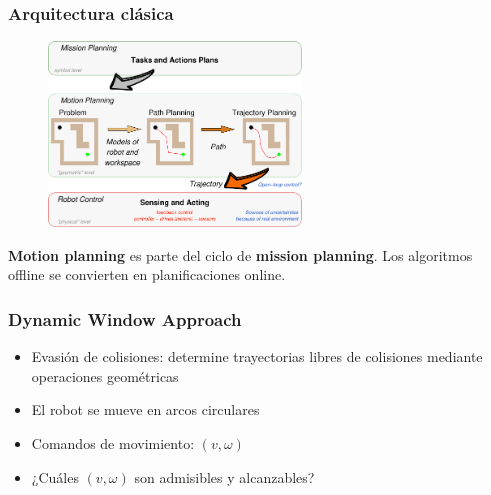 \begin{frame}
    \frametitle{Arquitectura clásica}
    
    \begin{figure}[!h]
        \includegraphics[width=0.6\textwidth]{images/motion_planning_architecture.pdf}
    \end{figure}

    {\bf Motion planning} es parte del ciclo de {\bf mission planning}. Los algoritmos offline se convierten en planificaciones online.
    
\end{frame}


\begin{frame}
	\frametitle{Dynamic Window Approach}
	
    \begin{itemize}
        \item Evasión de colisiones: determine trayectorias libres de colisiones mediante operaciones geométricas
        \item El robot se mueve en arcos circulares
        \item Comandos de movimiento: $(v,\omega)$
        \item ¿Cuáles $(v,\omega)$ son admisibles y alcanzables?
    \end{itemize}
    
\end{frame}


